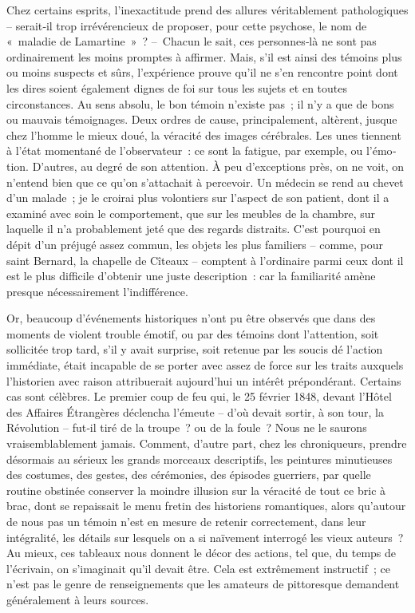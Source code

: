 \documentclass[french,twoside]{book} %
\begin{document}
Chez certains esprits, l’inexactitude prend des allures véritablement pathologiques – serait‑il trop irrévérencieux de proposer, pour cette psychose, le nom de « maladie de Lamartine » ? – Chacun le sait, ces personnes‑là ne sont pas ordinairement les moins promptes à affirmer. Mais, s’il est ainsi des témoins plus ou moins suspects et sûrs, l’expérience prouve qu’il ne s’en rencontre point dont les dires soient également dignes de foi sur tous les sujets et en toutes circonstances. Au sens absolu, le bon témoin n’existe pas ; il n’y a que de bons ou mauvais témoignages. Deux ordres de cause, principalement, altèrent, jusque chez l’homme le mieux doué, la véracité des images cérébrales. Les unes tiennent à l’état momentané de l’observateur : ce sont la fatigue, par exemple, ou l’émo­tion. D’autres, au degré de son attention. À peu d’exceptions près, on ne voit, on n’entend bien que ce qu’on s’attachait à percevoir. Un médecin se rend au chevet d’un malade ; je le croirai plus volontiers sur l’aspect de son patient, dont il a examiné avec soin le comportement, que sur les meubles de la chambre, sur laquelle il n’a probablement jeté que des regards distraits. C’est pourquoi en dépit d’un préjugé assez commun, les objets les plus familiers – comme, pour saint Bernard, la chapelle de Cîteaux – comptent à l’ordinaire parmi ceux dont il est le plus difficile d’obtenir une juste description : car la familiarité amène presque néces­sairement l’indifférence.\par
Or, beaucoup d’événements historiques n’ont pu être observés que dans des moments de violent trouble émotif, ou par des témoins dont l’atten­tion, soit sollicitée trop tard, s’il y avait surprise, soit retenue par les soucis dé l’action immédiate, était incapable de se porter avec assez de force sur les traits auxquels l’historien avec raison attribuerait aujour­d’hui un intérêt prépondérant. Certains cas sont célèbres. Le premier coup de feu qui, le 25 février 1848, devant l’Hôtel des Affaires Étrangères  
\label{p48} déclencha l’émeute – d’où devait sortir, à son tour, la Révolution – fut‑il tiré de la troupe ? ou de la foule ? Nous ne le saurons vraisembla­blement jamais. Comment, d’autre part, chez les chroniqueurs, prendre désormais au sérieux les grands morceaux descriptifs, les peintures minu­tieuses des costumes, des gestes, des cérémonies, des épisodes guerriers, par quelle routine obstinée conserver la moindre illusion sur la véracité de tout ce bric à brac, dont se repaissait le menu fretin des historiens romantiques, alors qu’autour de nous pas un témoin n’est en mesure de retenir correctement, dans leur intégralité, les détails sur lesquels on a si naïvement interrogé les vieux auteurs ? Au mieux, ces tableaux nous donnent le décor des actions, tel que, du temps de l’écrivain, on s’imaginait qu’il devait être. Cela est extrêmement instructif ; ce n’est pas le genre de renseignements que les amateurs de pittoresque demandent générale­ment à leurs sources.\par
\end{document}

